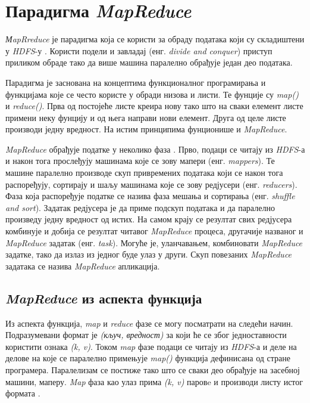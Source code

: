 \documentclass[12pt,oneside]{memoir}
\begin{document}

\section{Парадигма \textit{MapReduce}}
\label{sec:mr}

\textit{МapRreduce} је парадигма која се користи за обраду података који су складиштени у \textit{HDFS}-у \cite{hadoop_beginner}. Користи подели и завладај (енг. \textit{divide and conquer}) приступ приликом обраде тако да више машина паралелно обрађује један део података.

Парадигма је заснована на концептима функционалног програмирања и функцијама које се често користе у обради низова и листи. Те фунције су \textit{map()} и \textit{reduce()}. Прва од постојеће листе креира нову тако што на сваки елемент листе примени неку фунцију и од њега направи нови елемент. Друга од целе листе производи једну вредност. На истим принципима фунционише и \textit{MapReduce}.

\textit{MapReduce} обрађује податке у неколико фаза \cite{hadoop_learning}. Прво, подаци се читају из \textit{HDFS}-а и након тога прослеђују машинама које се зову мапери (енг. \textit{mappers}). Те машине паралелно производе скуп привремених података који се након тога распоређују, сортирају и шаљу машинама које се зову редјусери (енг. \textit{reducers}). Фаза која распоређује податке се назива фаза мешања и сортирања (енг. \textit{shuffle and sort}). Задатак редјусера је да приме подскуп података и да паралелно произведу једну вредност од истих. На самом крају се резултат свих редјусера комбинује и добија се резултат читавог \textit{MapReduce} процеса, другачије названог и \textit{MapReduce} задатак (енг. \textit{task}). Могуће је, уланчавањем, комбиновати \textit{MapReduce} задатке, тако да излаз из једног буде улаз у други. Скуп повезаних \textit{MapReduce} задатака се назива \textit{MapReduce} апликација.

\subsection{\textit{MapReduce} из аспекта функција}
\label{subsec:mr_funck_asp}

Из аспекта функција, \textit{map} и \textit{reduce} фазе се могу посматрати на следећи начин. Подразумевани формат је \textit{(кључ, вредност)} за који ће се због једноставности користити ознака \textit{(k, v)}. Током \textit{map} фазе подаци се читају из \textit{HDFS}-а и деле на делове на које се паралелно примењује \textit{map()} функција дефинисана од стране програмера. Паралелизам се постиже тако што се сваки део обрађује на засебној машини, маперу. \textit{Map} фаза као улаз прима \textit{(k, v)} паровe и производи листу истог формата \cite{hadoop_learning}.
\end{document}
